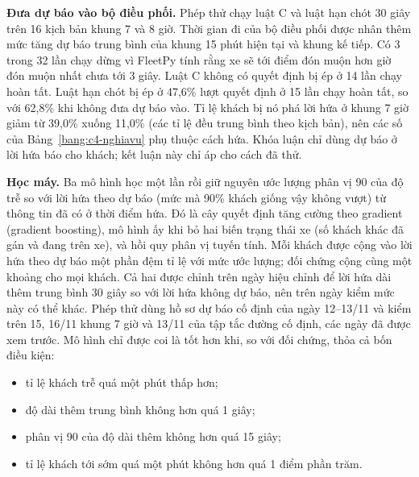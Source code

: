 \textbf{Đưa dự báo vào bộ điều phối.} Phép thử chạy luật C và luật hạn chót 30 giây trên 16 kịch bản khung 7 và 8 giờ.
Thời gian đi của bộ điều phối được nhân thêm mức tăng dự báo trung bình của khung 15 phút hiện tại và khung kế tiếp. Có
3 trong 32 lần chạy dừng vì FleetPy tính rằng xe sẽ tới điểm đón muộn hơn giờ đón muộn nhất chưa tới 3 giây. Luật C
không có quyết định bị ép ở 14 lần chạy hoàn tất. Luật hạn chót bị ép ở 47,6\% lượt quyết định ở 15 lần chạy hoàn tất,
so với 62,8\% khi không đưa dự báo vào. Tỉ lệ khách bị nó phá lời hứa ở khung 7 giờ giảm từ 39,0\% xuống 11,0\% (các
tỉ lệ đều trung bình theo kịch bản), nên các số của Bảng~\ref{bang:c4-nghiavu} phụ thuộc cách hứa. Khóa luận chỉ dùng
dự báo ở lời hứa báo cho khách; kết luận này chỉ áp cho cách đã thử.

\textbf{Học máy.} Ba mô hình học một lần rồi giữ nguyên ước lượng phân vị 90 của độ trễ so với lời hứa theo dự báo (mức
mà 90\% khách giống vậy không vượt) từ thông tin đã có ở thời điểm hứa. Đó là cây quyết định tăng cường theo gradient
(gradient boosting), mô hình ấy khi bỏ hai biến trạng thái xe (số khách khác đã gán và đang trên xe), và hồi quy phân vị
tuyến tính. Mỗi khách được cộng vào lời hứa theo dự báo một phần đệm tỉ lệ với mức ước lượng; đối chứng cộng cùng một
khoảng cho mọi khách. Cả hai được chỉnh trên ngày hiệu chỉnh để lời hứa dài thêm trung bình 30 giây so với lời hứa không
dự báo, nên trên ngày kiểm mức này có thể khác. Phép thử dùng hồ sơ dự báo cố định của ngày
12--13/11 và kiểm trên 15, 16/11 khung 7 giờ và 13/11 của tập tắc đường cố định, các ngày đã được xem trước. Mô hình
chỉ được coi là tốt hơn khi, so với đối chứng, thỏa cả bốn điều kiện:
\begin{itemize}[leftmargin=1.2cm,itemsep=0pt,topsep=2pt]
\item tỉ lệ khách trễ quá một phút thấp hơn;
\item độ dài thêm trung bình không hơn quá 1 giây;
\item phân vị 90 của độ dài thêm không hơn quá 15 giây;
\item tỉ lệ khách tới sớm quá một phút không hơn quá 1 điểm phần trăm.
\end{itemize}


